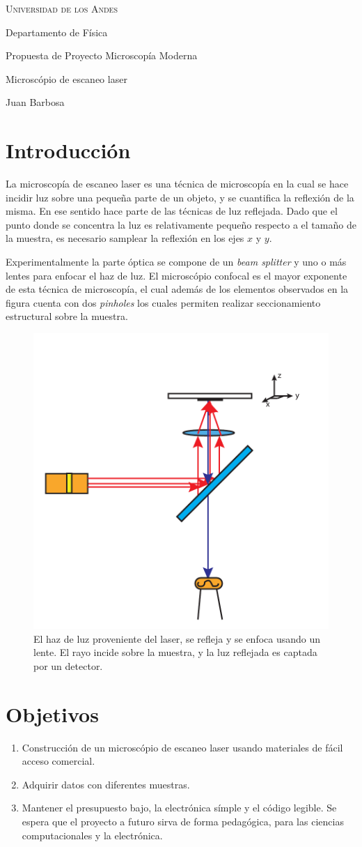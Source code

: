 \documentclass[11pt]{article}
\begin{document}
	{	\centering
		\scshape
		\LARGE
		Universidad de los Andes
		
		\large
		Departamento de F\'isica
		
		\vspace{1cm}
		
		Propuesta de Proyecto Microscop\'ia Moderna
		
		Microsc\'opio de escaneo laser
		
		\normalsize
		Juan Barbosa
		
	}
	
	\section{Introducci\'on}		
		La microscop\'ia de escaneo laser es una t\'ecnica de microscop\'ia en la cual se hace incidir luz sobre una peque\~na parte de un objeto, y se cuantifica la reflexi\'on de la misma. En ese sentido hace parte de las t\'ecnicas de luz reflejada. Dado que el punto donde se concentra la luz es relativamente peque\~no respecto a el tama\~no de la muestra, es necesario samplear la reflexi\'on en los ejes $x$ y $y$.
		
		Experimentalmente la parte \'optica se compone de un \textit{beam splitter} y uno o m\'as lentes para enfocar el haz de luz. 	El microscópio confocal es el mayor exponente de esta técnica de microscopía, el cual además de los elementos observados en la figura cuenta con dos \textit{pinholes} los cuales permiten realizar seccionamiento estructural sobre la muestra.
		
		\begin{figure}[h]
			\centering
			\includegraphics[width=0.35\linewidth]{beam.pdf}
			\caption{El haz de luz proveniente del laser, se refleja y se enfoca usando un lente. El rayo incide sobre la muestra, y la luz reflejada es captada por un detector.}
		\end{figure}
	
	\section{Objetivos}
		\begin{enumerate}
			\item Construcci\'on de un microsc\'opio de escaneo laser usando materiales de f\'acil acceso comercial.
			\item Adquirir datos con diferentes muestras.
			\item Mantener el presupuesto bajo, la electr\'onica s\'imple y el c\'odigo legible. Se espera que el proyecto a futuro sirva de forma pedag\'ogica, para las ciencias computacionales y la electr\'onica.
		\end{enumerate}
	
\end{document}
